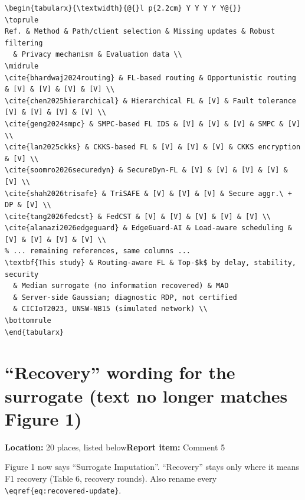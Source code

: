 \documentclass[10pt,a4paper]{article}
\newcommand{\issue}[3]{\section{#1}{\raggedright\noindent\textcolor{note}{\small\textbf{Location:} #2\quad\textbf{Report item:} #3}\par}\smallskip}
\newcommand{\why}[1]{\noindent\textcolor{note}{\small #1}\par\smallskip}
\begin{document}
\begin{after}
\begin{Verbatim}
\begin{tabularx}{\textwidth}{@{}l p{2.2cm} Y Y Y Y Y@{}}
\toprule
Ref. & Method & Path/client selection & Missing updates & Robust filtering
  & Privacy mechanism & Evaluation data \\
\midrule
\cite{bhardwaj2024routing} & FL-based routing & Opportunistic routing & [V] & [V] & [V] & [V] \\
\cite{chen2025hierarchical} & Hierarchical FL & [V] & Fault tolerance [V] & [V] & [V] & [V] \\
\cite{geng2024smpc} & SMPC-based FL IDS & [V] & [V] & [V] & SMPC & [V] \\
\cite{lan2025ckks} & CKKS-based FL & [V] & [V] & [V] & CKKS encryption & [V] \\
\cite{soomro2026securedyn} & SecureDyn-FL & [V] & [V] & [V] & [V] & [V] \\
\cite{shah2026trisafe} & TriSAFE & [V] & [V] & [V] & Secure aggr.\ + DP & [V] \\
\cite{tang2026fedcst} & FedCST & [V] & [V] & [V] & [V] & [V] \\
\cite{alanazi2026edgeguard} & EdgeGuard-AI & Load-aware scheduling & [V] & [V] & [V] & [V] \\
% ... remaining references, same columns ...
\textbf{This study} & Routing-aware FL & Top-$k$ by delay, stability, security
  & Median surrogate (no information recovered) & MAD
  & Server-side Gaussian; diagnostic RDP, not certified
  & CICIoT2023, UNSW-NB15 (simulated network) \\
\bottomrule
\end{tabularx}
\end{Verbatim}
\end{after}

\issue{``Recovery'' wording for the surrogate (text no longer matches Figure 1)}{20 places, listed below}{Comment 5}
\why{Figure 1 now says ``Surrogate Imputation''. ``Recovery'' stays only where it means F1 recovery (Table 6, recovery rounds). Also rename every \texttt{\textbackslash eqref\{eq:recovered-update\}}.}
\end{document}
